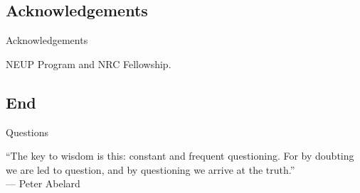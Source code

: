 \documentclass[10pt,t,xcolor=table]{beamer}
\begin{document}
    
    \subsection*{Acknowledgements}
    \begin{frame}[c]{Acknowledgements}
        \begin{center}
                NEUP Program and NRC Fellowship.
        \end{center}
    \end{frame}
        

    \subsection*{End}
    \begin{frame}[c]{Questions}
        \begin{center}
                ``The key to wisdom is this: constant and frequent questioning. 
                  For by doubting we are led to question, and by questioning we arrive at the truth.''\\
                \hfill --- Peter Abelard
        \end{center}
    \end{frame}



\appendix

\end{document}
